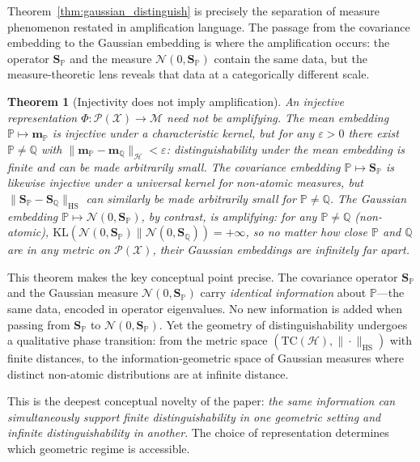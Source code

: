 \documentclass[12pt, oneside]{book}
\theoremstyle{plain}
\newtheorem{theorem}{Theorem}[chapter]
\theoremstyle{definition}
\newcommand{\calH}{\mathcal{H}}
\newcommand{\calX}{\mathcal{X}}
\newcommand{\calP}{\mathcal{P}}
\newcommand{\calN}{\mathcal{N}}
\newcommand{\PP}{\mathbb{P}}
\newcommand{\QQ}{\mathbb{Q}}
\newcommand{\HS}{\mathrm{HS}}
\newcommand{\mP}{\mathbf{m}_{\PP}}
\newcommand{\mQ}{\mathbf{m}_{\QQ}}
\newcommand{\SP}{\mathbf{S}_{\PP}}
\newcommand{\SQ}{\mathbf{S}_{\QQ}}
\newcommand{\KL}{\mathrm{KL}}
\newcommand{\calM}{\mathcal{M}}
\begin{document}
Theorem~\ref{thm:gaussian_distinguish} is precisely the separation of measure phenomenon restated in amplification language. The passage from the covariance embedding to the Gaussian embedding is where the amplification occurs: the operator $\SP$ and the measure $\calN(0, \SP)$ contain the same data, but the measure-theoretic lens reveals that data at a categorically different scale.

\begin{theorem}[Injectivity does not imply amplification]
\label{thm:inj_neq_amp}
An injective representation $\Phi: \calP(\calX) \to \calM$ need not be amplifying. The mean embedding $\PP \mapsto \mP$ is injective under a characteristic kernel, but for any $\varepsilon > 0$ there exist $\PP \neq \QQ$ with $\|\mP - \mQ\|_{\calH} < \varepsilon$: distinguishability under the mean embedding is finite and can be made arbitrarily small. The covariance embedding $\PP \mapsto \SP$ is likewise injective under a universal kernel for non-atomic measures, but $\|\SP - \SQ\|_{\HS}$ can similarly be made arbitrarily small for $\PP \neq \QQ$. The Gaussian embedding $\PP \mapsto \calN(0, \SP)$, by contrast, is amplifying: for any $\PP \neq \QQ$ (non-atomic), $\KL(\calN(0,\SP) \| \calN(0,\SQ)) = +\infty$, so no matter how close $\PP$ and $\QQ$ are in any metric on $\calP(\calX)$, their Gaussian embeddings are infinitely far apart.
\end{theorem}

This theorem makes the key conceptual point precise. The covariance operator $\SP$ and the Gaussian measure $\calN(0, \SP)$ carry \emph{identical information} about $\PP$---the same data, encoded in operator eigenvalues. No new information is added when passing from $\SP$ to $\calN(0, \SP)$. Yet the geometry of distinguishability undergoes a qualitative phase transition: from the metric space $(\mathrm{TC}(\calH), \|\cdot\|_{\HS})$ with finite distances, to the information-geometric space of Gaussian measures where distinct non-atomic distributions are at infinite distance.

This is the deepest conceptual novelty of the paper: \emph{the same information can simultaneously support finite distinguishability in one geometric setting and infinite distinguishability in another}. The choice of representation determines which geometric regime is accessible.
\end{document}
